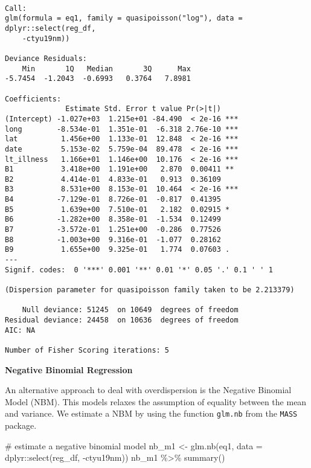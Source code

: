 \documentclass[
  letterpaper,
  krantz2]{style/krantz}
\newenvironment{Shaded}{\begin{snugshade}}{\end{snugshade}}
\newcommand{\AttributeTok}[1]{\textcolor[rgb]{0.40,0.45,0.13}{#1}}
\newcommand{\CommentTok}[1]{\textcolor[rgb]{0.37,0.37,0.37}{#1}}
\newcommand{\FunctionTok}[1]{\textcolor[rgb]{0.28,0.35,0.67}{#1}}
\newcommand{\NormalTok}[1]{\textcolor[rgb]{0.00,0.23,0.31}{#1}}
\newcommand{\OtherTok}[1]{\textcolor[rgb]{0.00,0.23,0.31}{#1}}
\newcommand{\SpecialCharTok}[1]{\textcolor[rgb]{0.37,0.37,0.37}{#1}}
\begin{document}
\begin{verbatim}

Call:
glm(formula = eq1, family = quasipoisson("log"), data = dplyr::select(reg_df, 
    -ctyu19nm))

Deviance Residuals: 
    Min       1Q   Median       3Q      Max  
-5.7454  -1.2043  -0.6993   0.3764   7.8981  

Coefficients:
              Estimate Std. Error t value Pr(>|t|)    
(Intercept) -1.027e+03  1.215e+01 -84.490  < 2e-16 ***
long        -8.534e-01  1.351e-01  -6.318 2.76e-10 ***
lat          1.456e+00  1.133e-01  12.848  < 2e-16 ***
date         5.153e-02  5.759e-04  89.478  < 2e-16 ***
lt_illness   1.166e+01  1.146e+00  10.176  < 2e-16 ***
B1           3.418e+00  1.191e+00   2.870  0.00411 ** 
B2           4.414e-01  4.833e-01   0.913  0.36109    
B3           8.531e+00  8.153e-01  10.464  < 2e-16 ***
B4          -7.129e-01  8.726e-01  -0.817  0.41395    
B5           1.639e+00  7.510e-01   2.182  0.02915 *  
B6          -1.282e+00  8.358e-01  -1.534  0.12499    
B7          -3.572e-01  1.251e+00  -0.286  0.77526    
B8          -1.003e+00  9.316e-01  -1.077  0.28162    
B9           1.655e+00  9.325e-01   1.774  0.07603 .  
---
Signif. codes:  0 '***' 0.001 '**' 0.01 '*' 0.05 '.' 0.1 ' ' 1

(Dispersion parameter for quasipoisson family taken to be 2.213379)

    Null deviance: 51245  on 10649  degrees of freedom
Residual deviance: 24458  on 10636  degrees of freedom
AIC: NA

Number of Fisher Scoring iterations: 5
\end{verbatim}

\textbf{Negative Binomial Regression}

An alternative approach to deal with overdispersion is the Negative
Binomial Model (NBM). This models relaxes the assumption of equality
between the mean and variance. We estimate a NBM by using the function
\texttt{glm.nb} from the \texttt{MASS} package.

\begin{Shaded}
\begin{Highlighting}[]
\CommentTok{\# estimate a negative binomial model}
\NormalTok{nb\_m1 }\OtherTok{\textless{}{-}} \FunctionTok{glm.nb}\NormalTok{(eq1, }
       \AttributeTok{data =}\NormalTok{ dplyr}\SpecialCharTok{::}\FunctionTok{select}\NormalTok{(reg\_df, }\SpecialCharTok{{-}}\NormalTok{ctyu19nm))}
\NormalTok{nb\_m1 }\SpecialCharTok{\%\textgreater{}\%} \FunctionTok{summary}\NormalTok{()}
\end{Highlighting}
\end{Shaded}
\end{document}
